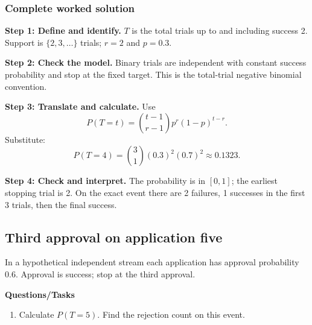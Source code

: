 \subsubsection*{Complete worked solution}
\par\noindent\begin{minipage}{\linewidth}
\textbf{Step 1: Define and identify.} $T$ is the total trials up to and including success 2. Support is $\{2,3,\ldots\}$ trials; $r=2$ and $p=0.3$.
\end{minipage}\par\medskip
\par\noindent\begin{minipage}{\linewidth}
\textbf{Step 2: Check the model.} Binary trials are independent with constant success probability and stop at the fixed target. This is the total-trial negative binomial convention.
\end{minipage}\par\medskip
\par\noindent\begin{minipage}{\linewidth}
\textbf{Step 3: Translate and calculate.} Use
\[P(T=t)=\binom{t-1}{r-1}p^r(1-p)^{t-r}.\]
Substitute:
\[P(T=4)=\binom{3}{1}(0.3)^2(0.7)^{2}\approx 0.1323.\]
\end{minipage}\par\medskip
\par\noindent\begin{minipage}{\linewidth}
\textbf{Step 4: Check and interpret.} The probability is in $[0,1]$; the earliest stopping trial is 2. On the exact event there are 2 failures, 1 successes in the first 3 trials, then the final success. 
\end{minipage}\par\medskip
{}
\subsection{Third approval on application five}
In a hypothetical independent stream each application has approval probability 0.6. Approval is success; stop at the third approval.

\textbf{Questions/Tasks}
\begin{enumerate}
\item Calculate $P(T=5)$. Find the rejection count on this event.
\end{enumerate}
